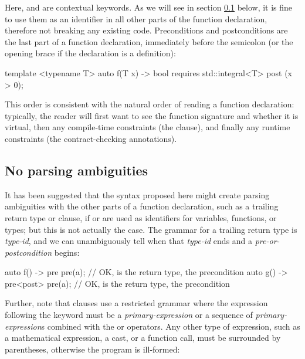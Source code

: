Here,  and  are contextual keywords. As we will see in section \ref{subsec:noambig} below, it is fine to use them as an identifier in all other parts of the function declaration, therefore not breaking any existing code. Preconditions and postconditions are the last part of a function declaration, immediately before the semicolon (or the opening brace if the declaration is a definition):

\vspace{2mm}
\begin{codeblock}
template <typename T>
auto f(T x) -> bool
  requires std::integral<T>
  post (x > 0);
\end{codeblock}
\vspace{2mm}

This order is consistent with the natural order of reading a function declaration: typically, the reader will first want to see the function signature and whether it is virtual, then any compile-time constraints (the  clause), and finally any runtime constraints (the contract-checking annotations).


\subsection{No parsing ambiguities}
\label{subsec:noambig}

It has been suggested that the syntax proposed here might create parsing ambiguities with the other parts of a function declaration, such as a trailing return type or  clause, if  or  are used as identifiers for variables, functions, or types; but this is not actually the case. The grammar for a trailing return type is \tcode{->} \emph{type-id}, and we can unambiguously tell when that \emph{type-id} ends and a \emph{pre-or-postcondition} begins:

\vspace{2mm}
\begin{codeblock}
auto f() -> pre pre(a);   // OK,  is the return type,  the precondition
auto g() -> pre<post> pre(a);  // OK,  is the return type,  the precondition
\end{codeblock}
\vspace{2mm}

Further, note that  clauses use a restricted grammar where the expression following the  keyword must be a \emph{primary-expression} or a sequence of \emph{primary-expression}s combined with the \tcode{\&\&} or \tcode{||} operators. Any other type of expression, such as a mathematical expression, a cast, or a function call, must be surrounded by parentheses, otherwise the program is ill-formed:

